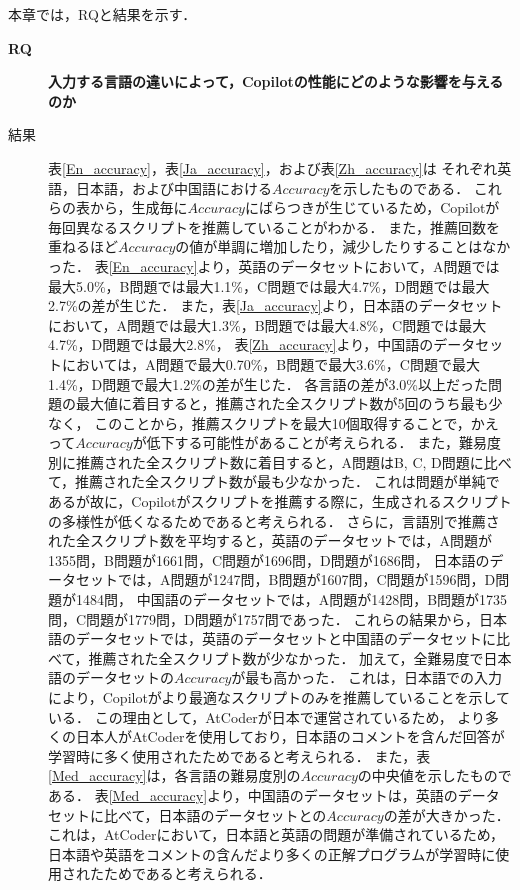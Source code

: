   本章では，RQと結果を示す．
  \begin{description}
    \item[\textbf{RQ}] \textbf{入力する言語の違いによって，Copilotの性能にどのような影響を与えるのか}
      \item[結果]
      
      表\ref{En_accuracy}，表\ref{Ja_accuracy}，および表\ref{Zh_accuracy}は
      それぞれ英語，日本語，および中国語における$Accuracy$を示したものである．
      これらの表から，生成毎に$Accuracy$にばらつきが生じているため，Copilotが毎回異なるスクリプトを推薦していることがわかる．
      また，推薦回数を重ねるほど$Accuracy$の値が単調に増加したり，減少したりすることはなかった．
      表\ref{En_accuracy}より，英語のデータセットにおいて，A問題では最大5.0\%，B問題では最大1.1\%，C問題では最大4.7\%，D問題では最大2.7\%の差が生じた．
      また，表\ref{Ja_accuracy}より，日本語のデータセットにおいて，A問題では最大1.3\%，B問題では最大4.8\%，C問題では最大4.7\%，D問題では最大2.8\%，
      表\ref{Zh_accuracy}より，中国語のデータセットにおいては，A問題で最大0.70\%，B問題で最大3.6\%，C問題で最大1.4\%，D問題で最大1.2\%の差が生じた．
      各言語の差が3.0\%以上だった問題の最大値に着目すると，推薦された全スクリプト数が5回のうち最も少なく，
      このことから，推薦スクリプトを最大10個取得することで，かえって$Accuracy$が低下する可能性があることが考えられる．
      また，難易度別に推薦された全スクリプト数に着目すると，A問題はB, C, D問題に比べて，推薦された全スクリプト数が最も少なかった．
      これは問題が単純であるが故に，Copilotがスクリプトを推薦する際に，生成されるスクリプトの多様性が低くなるためであると考えられる．
      さらに，言語別で推薦された全スクリプト数を平均すると，英語のデータセットでは，A問題が1355問，B問題が1661問，C問題が1696問，D問題が1686問，
      日本語のデータセットでは，A問題が1247問，B問題が1607問，C問題が1596問，D問題が1484問，
      中国語のデータセットでは，A問題が1428問，B問題が1735問，C問題が1779問，D問題が1757問であった．
      これらの結果から，日本語のデータセットでは，英語のデータセットと中国語のデータセットに比べて，推薦された全スクリプト数が少なかった．
      加えて，全難易度で日本語のデータセットの$Accuracy$が最も高かった．
      これは，日本語での入力により，Copilotがより最適なスクリプトのみを推薦していることを示している．
      この理由として，AtCoder\cite{AtCoder}が日本で運営されているため，
      より多くの日本人がAtCoderを使用しており，日本語のコメントを含んだ回答が学習時に多く使用されたためであると考えられる．      
      また，表\ref{Med_accuracy}は，各言語の難易度別の$Accuracy$の中央値を示したものである．   
      表\ref{Med_accuracy}より，中国語のデータセットは，英語のデータセットに比べて，日本語のデータセットとの$Accuracy$の差が大きかった．
      これは，AtCoder\cite{AtCoder}において，日本語と英語の問題が準備されているため，
      日本語や英語をコメントの含んだより多くの正解プログラムが学習時に使用されたためであると考えられる．


\end{description}
